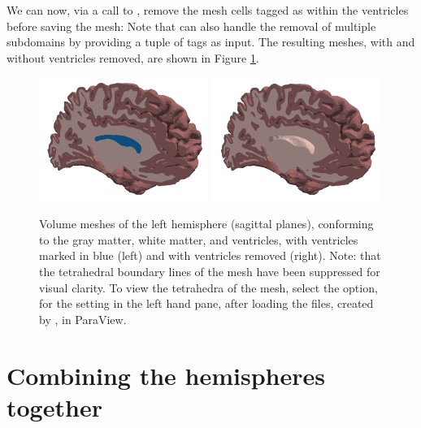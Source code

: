 We can now, via a call to \svmtk{} ,
remove the mesh cells tagged as within the ventricles before saving
the mesh:
Note that  can also handle the removal of
multiple subdomains by providing a tuple of tags as input. The resulting
meshes, with and without ventricles removed, are shown in Figure
\ref{fig:chp4:tags-with-without-ventricles}.
\begin{center}
\begin{figure}
  \includegraphics[width=0.49\textwidth]{./graphics/chp4/ernie-final-comp-b}
  \includegraphics[width=0.49\textwidth]{./graphics/chp4/ernie-final-comp-d}
    \caption{Volume meshes of the left hemisphere (sagittal planes),
      conforming to the gray matter, white matter, and ventricles, with
      ventricles marked in blue (left) and with ventricles removed (right).  
	Note: that the tetrahedral boundary lines of the mesh have been 
	suppressed for visual clarity.  To view the tetrahedra of the mesh, 
	select the  option, for the  
	setting in the left hand pane, after loading the  files, 
	created by , in ParaView. 
	}
    \label{fig:chp4:tags-with-without-ventricles}
\end{figure}
\end{center}

\section{Combining the hemispheres together}
\label{sec:chp4-left-right-tagged}

